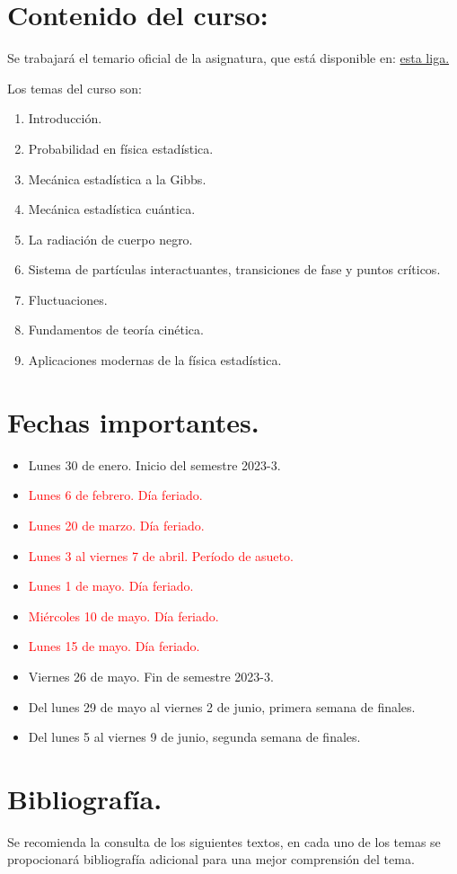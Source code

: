 \section{Contenido del curso:}
Se trabajará el temario oficial de la asignatura, que está disponible en: \href{https://www.fciencias.unam.mx/sites/default/files/temario/829.pdf}{esta liga.}

Los temas del curso son:

\begin{enumerate}
\item Introducción.
\item Probabilidad en física estadística.
\item Mecánica estadística a la Gibbs.
\item Mecánica estadística cuántica.
\item La radiación de cuerpo negro.
\item Sistema de partículas interactuantes, transiciones de fase y puntos críticos.
\item Fluctuaciones.
\item Fundamentos de teoría cinética.
\item Aplicaciones modernas de la física estadística.
\end{enumerate}

\section{Fechas importantes.}

\begin{itemize}
\setlength\itemsep{1pt}
\item Lunes 30 de enero. Inicio del semestre 2023-3.
\item \textcolor{red}{Lunes 6 de febrero. Día feriado.}
\item \textcolor{red}{Lunes 20 de marzo. Día feriado.}
\item \textcolor{red}{Lunes 3 al viernes 7 de abril. Período de asueto.}
\item \textcolor{red}{Lunes 1 de mayo. Día feriado.}
\item \textcolor{red}{Miércoles 10 de mayo. Día feriado.}
\item \textcolor{red}{Lunes 15 de mayo. Día feriado.}
\item Viernes 26 de mayo. Fin de semestre 2023-3.
\item Del lunes 29 de mayo al viernes 2 de junio, primera semana de finales.
\item Del lunes 5 al viernes 9 de junio, segunda semana de finales.
\end{itemize}

\section{Bibliografía.}

Se recomienda la consulta de los siguientes textos, en cada uno de los temas se propocionará bibliografía adicional para una mejor comprensión del tema.
\nocite{*}
\printbibliography[keyword={basica}, title={Referencias Básicas}]
\printbibliography[keyword={complementaria}, title={Referencias Complementarias}]

